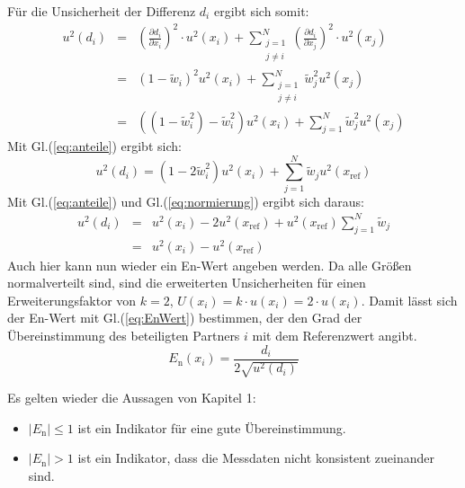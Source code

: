 \begin{itemize}
Für die Unsicherheit der Differenz $d_i$ ergibt sich somit:
\begin{eqnarray}
u^2(d_i) &=& \left( \frac{\partial d_i}{\partial x_i} \right)^2 \cdot u^2(x_i) +  \sum_{\substack{j=1 \\ j \neq i}}^{N}
\left( \frac{\partial d_i}{\partial x_j} \right)^2 \cdot u^2(x_j) \\
&=&  (1-\tilde w_i)^2 u^2(x_i) + \sum_{\substack{j=1 \\ j \neq i}}^{N} \tilde w_j^2 u^2( x_j) \\
&=& ((1-\tilde w_i^2)-\tilde w_i^2)u^2(x_i) + \sum_{j=1}^{N} \tilde w_j^2 u^2(x_j)
\end{eqnarray}
Mit Gl.(\ref{eq:anteile}) ergibt sich:
\begin{equation}
u^2(d_i) = (1-2\tilde w_i^2)u^2(x_i) + \sum_{j=1}^{N} \tilde w_j u^2(x_\mathrm{ref})
\end{equation}
Mit Gl.(\ref{eq:anteile}) und Gl.(\ref{eq:normierung}) ergibt sich daraus:
\begin{eqnarray}
u^2(d_i) &=& u^2(x_i) - 2u^2(x_\mathrm{ref}) + u^2(x_\mathrm{ref}) \sum_{j=1}^{N}\tilde w_j
\nonumber \\
  &=& u^2(x_i) -u^2(x_\mathrm{ref})
\end{eqnarray}
Auch hier kann nun wieder ein En-Wert angeben werden. Da alle Größen normalverteilt sind, sind die erweiterten Unsicherheiten für einen
Erweiterungsfaktor von $k=2$, $U(x_i) = k \cdot u(x_i) =2 \cdot u(x_i)$. Damit lässt sich der En-Wert mit Gl.(\ref{eq:EnWert}) bestimmen, der den
Grad der Übereinstimmung des beteiligten Partners $i$ mit dem Referenzwert
angibt.
\begin{equation}
E_\mathrm{n}(x_i) = \frac{d_i}{2\sqrt{u^2(d_i)}}
\end{equation}
\end{itemize}

Es gelten wieder die Aussagen von Kapitel 1:
\begin{itemize}
	\item $|E_\mathrm{n}| \leq 1$ ist ein Indikator für eine gute Übereinstimmung.
	\item $|E_\mathrm{n}| > 1 $ ist ein Indikator, dass die Messdaten nicht konsistent zueinander sind.
\end{itemize}
